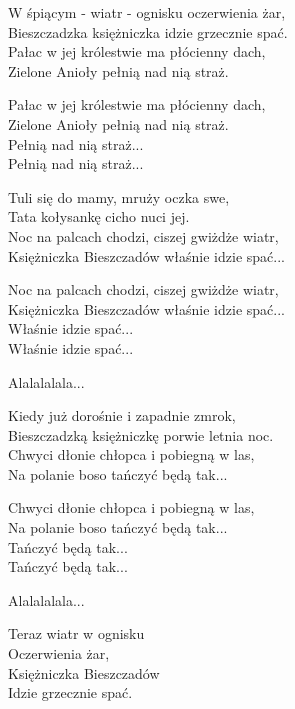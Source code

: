 \begin{text}
    W śpiącym - wiatr - ognisku oczerwienia żar,\\
    Bieszczadzka księżniczka idzie grzecznie spać.\\
    Pałac w jej królestwie ma płócienny dach,\\
    Zielone Anioły pełnią nad nią straż.

    \vin Pałac w jej królestwie ma płócienny dach,\\
    \vin Zielone Anioły pełnią nad nią straż.\\
    \vin Pełnią nad nią straż...\\
    \vin Pełnią nad nią straż...

    Tuli się do mamy, mruży oczka swe,\\
    Tata kołysankę cicho nuci jej.\\
    Noc na palcach chodzi, ciszej gwiżdże wiatr,\\
    Księżniczka Bieszczadów właśnie idzie spać...

    \vin Noc na palcach chodzi, ciszej gwiżdże wiatr,\\
    \vin Księżniczka Bieszczadów właśnie idzie spać...\\
    \vin Właśnie idzie spać...\\
    \vin Właśnie idzie spać...

    \vin Alalalalala...

    Kiedy już dorośnie i zapadnie zmrok,\\
    Bieszczadzką księżniczkę porwie letnia noc.\\
    Chwyci dłonie chłopca i pobiegną w las,\\
    Na polanie boso tańczyć będą tak...

    \vin Chwyci dłonie chłopca i pobiegną w las,\\
    \vin Na polanie boso tańczyć będą tak...\\
    \vin Tańczyć będą tak...\\
    \vin Tańczyć będą tak...

    \vin Alalalalala...

    Teraz wiatr w ognisku\\
    Oczerwienia żar,\\
    Księżniczka Bieszczadów\\
    Idzie grzecznie spać.
\end{text}
